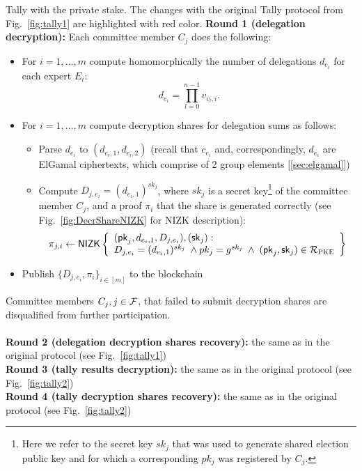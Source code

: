 \begin{boxfig}{\label{fig:private_tally}Tally with the private stake. The changes with the original Tally protocol from Fig.~\ref{fig:tally1} are highlighted with red color.}{}
\textbf{Round 1 (delegation decryption):}
Each committee member $C_j$ does the following:
\begin{itemize}
    \item For $i = 1,\ldots, m$ compute homomorphically the number of delegations $d_{e_i}$ for each expert $E_i$:
    {\color{red}\[d_{e_i}=\prod_{l=0}^{n-1} v_{v_l,i}.\]}
    \item For $i = 1,\ldots, m$ compute decryption shares for delegation sums as follows:
    \begin{itemize}
        \item Parse $d_{e_i}$ to $(d_{e_i,1}, d_{e_i,2})$ (recall that $c_{e_i}$ and, correspondingly, $d_{e_i}$ are ElGamal ciphertexts, which comprise of 2 group elements [\ref{sec:elgamal}])
        \item Compute $D_{j,e_i}=(d_{e_i,1})^{sk_j}$, where $sk_j$ is a secret key\footnote{Here we refer to the secret key $sk_j$ that was used to generate shared election public key and for which a corresponding $pk_j$ was registered by $C_j$.} of the committee member $C_j$, and a proof $\pi_i$ that the share is generated correctly (see Fig.~\ref{fig:DecrShareNIZK} for NIZK description):
        \begin{equation*}
        \pi_{j,i}\leftarrow\mathsf{NIZK}\left\{\begin{array}{l} (\mathsf{pk}_j, d_{e_i,1}, D_{j,e_i}),(\mathsf{sk}_j): \\
         D_{j,e_i}=(d_{e_i,1})^{sk_j} \; \wedge pk_j=g^{sk_j} \; \wedge \;  (\mathsf{pk}_j,\mathsf{sk}_j)\in\mathcal{R}_{\textsc{PKE}} \end{array}\right\}
        \end{equation*}
    \end{itemize}
    \item Publish $\{D_{j,e_i}, \pi_i\}_{i \in [m]}$ to the blockchain
\end{itemize}

Committee members $C_j, j \in \mathcal{F}$, that failed to submit decryption shares are disqualified from further participation.
\\~\\
\textbf{Round 2 (delegation decryption shares recovery):} the same as in the original protocol (see Fig.~\ref{fig:tally1})\\
\textbf{Round 3 (tally results decryption):} the same as in the original protocol (see Fig.~\ref{fig:tally2})\\
\textbf{Round 4 (tally decryption shares recovery):} the same as in the original protocol (see Fig.~\ref{fig:tally2})
\end{boxfig}